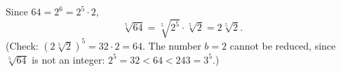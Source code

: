 Since $64=2^6=2^5\cdot2$,
\[\sqrt[5]{64}=\sqrt[5]{2^5}\cdot\sqrt[5]{2}=\boxed{2\sqrt[5]{2}}.\]
(Check: $\left(2\sqrt[5]2\right)^5=32\cdot2=64$. The number $b=2$ cannot be reduced, since $\sqrt[5]{64}$ is not an integer: $2^5=32<64<243=3^5$.)
